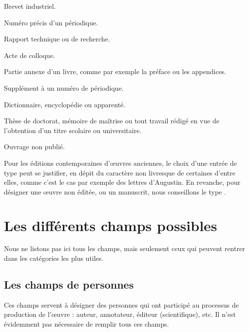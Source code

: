 \begin{choix}
	\item[\type{patent}]
	Brevet industriel.
	\item[\type{periodical}]
	Numéro précis d'un périodique.	
	\item[\type{report}]	
	Rapport technique ou de recherche.
	\item[\type{proceedings}]
	Acte de colloque.
	\item[\type{suppbook}]
	Partie annexe d'un livre, comme par exemple la préface ou les appendices.
	\item[\type{supperiodical}]
	Supplément à un numéro de périodique.
	\item[\type{reference}]
	Dictionnaire, encyclopédie ou apparenté.
	\item[\type{thesis}]
	Thèse de doctorat, mémoire de maîtrise ou tout travail rédigé en vue de l'obtention d'un titre scolaire ou universitaire.
	\item[\type{unpublished}]
	Ouvrage non publié.
\end{choix}

Pour les éditions contemporaines d'œuvres anciennes, le choix d'une entrée de type  peut se justifier, en dépit du caractère non livresque de certaines d'entre elles, comme c'est le cas par exemple des lettres d'Augustin. En revanche, pour désigner  une œuvre non éditée, ou un manuscrit, nous conseillons le type .

\section{Les différents champs possibles}

Nous ne listons pas ici tous les champs, mais seulement ceux qui peuvent rentrer dans les catégories les plus utiles.
\subsection{Les champs de personnes}

Ces champs servent à désigner des personnes qui ont participé au processus de production de l'œuvre : auteur, annotateur, éditeur (scientifique), etc. Il n'est évidemment pas nécessaire de remplir tous ces champs.


